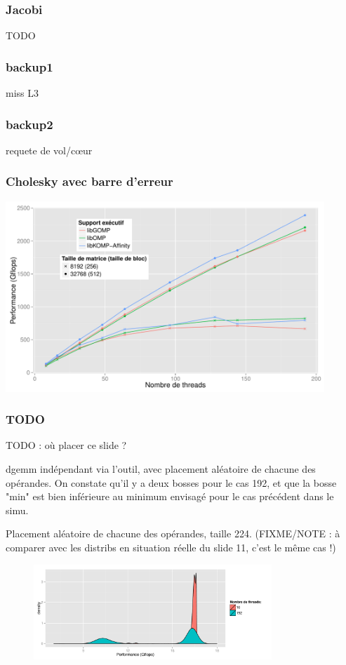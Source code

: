 \documentclass[xcolor={usenames,dvipsnames,svgnames,table}, aspectratio=43]{beamer}
\begin{document}
\begin{frame}
  \frametitle{Jacobi}

  TODO

\end{frame}

\begin{frame}
  \frametitle{backup1}

  miss L3

\end{frame}

\begin{frame}
  \frametitle{backup2}

  requete de vol/cœur

\end{frame}

\begin{frame}
  \frametitle{Cholesky avec barre d'erreur}

  \includegraphics[width=0.9\textwidth]{graph/graph_all_cholesky_idchire.pdf}

\end{frame}

\begin{frame}
\frametitle{TODO}

TODO : où placer ce slide ?

dgemm indépendant via l'outil, avec placement aléatoire de chacune des opérandes.
On constate qu'il y a deux bosses pour le cas 192, et que la bosse "min" est bien inférieure au minimum envisagé pour le cas précédent dans le simu.

Placement aléatoire de chacune des opérandes, taille 224.
(FIXME/NOTE : à comparer avec les distribs en situation réelle du slide 11, c'est le même cas !)

\begin{figure}
  \centering
  \includegraphics[width=0.8\textwidth]{graph/distrib_random_tool.pdf}
\end{figure}

\end{frame}
\end{document}
